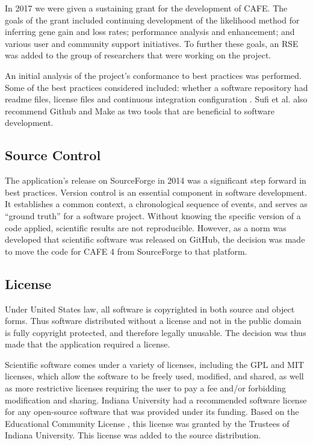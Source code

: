 \documentclass[acmtog, authorversion]{acmart}
\begin{document}
In 2017 we  were given a sustaining grant for the development of CAFE. The goals of the grant included continuing development of the likelihood method for inferring gene gain and loss rates; performance analysis and enhancement; and various user and community support initiatives. To further these goals, an RSE was added to the group of researchers that were working on the project.

An initial analysis of the project's conformance to best practices was performed. Some of the best practices considered included: whether a software repository had readme files, license files and continuous integration configuration \cite{Sufi2014}. Sufi et al. also recommend Github and Make as two tools that are beneficial to software development.

\subsection{Source Control}
The application's release on SourceForge in 2014 was a significant step forward in best practices. Version control is an essential component in software development. It establishes a common context, a chronological sequence of events, and serves as “ground truth” for a software project. Without knowing the specific version of a code applied, scientific results are not reproducible. \cite{Johnson2016} However, as a norm was developed that scientific software was released on GitHub, the decision was made to move the code for CAFE 4 from SourceForge to that platform.

\subsection{License}
Under United States law, all software is copyrighted in both source and object forms. Thus software distributed without a license and not in the public domain is fully copyright protected, and therefore legally unusable. The decision was thus made that the application required a license.

Scientific software comes under a variety of licenses, including the GPL and MIT licenses, which allow the software to be freely used, modified, and shared, as well as more restrictive licenses requiring the user to pay a fee and/or forbidding modification and sharing. Indiana University had a recommended software license for any open-source software that was provided under its funding. Based on the Educational Community License \cite{EduLicense}, this license was granted by the Trustees of Indiana University. This license was added to the source distribution.
\end{document}
